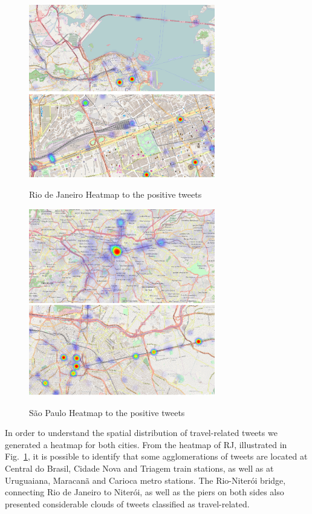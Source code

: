\begin{figure}[!htbp]
  \caption{Rio de Janeiro Heatmap to the positive tweets}
  \centering
    \includegraphics[width=0.725\textwidth]{figures/rio_1}
    \label{rio_heatmap}
\end{figure}

\begin{figure}[h]
  \caption{São Paulo Heatmap to the positive tweets}
  \centering
    \includegraphics[width=0.725\textwidth]{figures/sp_1}
    \label{sp_heatmap}
\end{figure}

In order to understand the spatial distribution of travel-related tweets we generated a heatmap for both cities. From the heatmap of RJ, illustrated in Fig.~\ref{rio_heatmap}, it is possible to identify that some agglomerations of tweets are located at Central do Brasil, Cidade Nova and Triagem train stations, as well as at Uruguaiana, Maracanã and Carioca metro stations. The Rio-Niterói bridge, connecting Rio de Janeiro to Niterói, as well as the piers on both sides also presented considerable clouds of tweets classified as travel-related.

